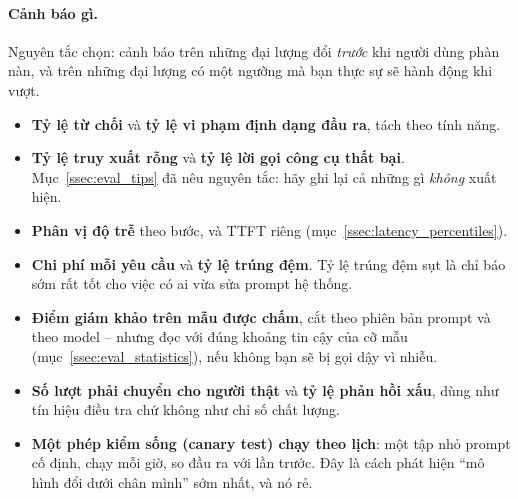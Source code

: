 \paragraph{Cảnh báo gì.} Nguyên tắc chọn: cảnh báo trên những đại lượng đổi \emph{trước} khi người dùng phàn nàn, và trên những đại lượng có một ngưỡng mà bạn thực sự sẽ hành động khi vượt.

\begin{itemize}
	\item \textbf{Tỷ lệ từ chối} và \textbf{tỷ lệ vi phạm định dạng đầu ra}, tách theo tính năng.
	\item \textbf{Tỷ lệ truy xuất rỗng} và \textbf{tỷ lệ lời gọi công cụ thất bại}. Mục~\ref{ssec:eval_tips} đã nêu nguyên tắc: hãy ghi lại cả những gì \emph{không} xuất hiện.
	\item \textbf{Phân vị độ trễ} theo bước, và TTFT riêng (mục~\ref{ssec:latency_percentiles}).
	\item \textbf{Chi phí mỗi yêu cầu} và \textbf{tỷ lệ trúng đệm}. Tỷ lệ trúng đệm sụt là chỉ báo sớm rất tốt cho việc có ai vừa sửa prompt hệ thống.
	\item \textbf{Điểm giám khảo trên mẫu được chấm}, cắt theo phiên bản prompt và theo model -- nhưng đọc với đúng khoảng tin cậy của cỡ mẫu (mục~\ref{ssec:eval_statistics}), nếu không bạn sẽ bị gọi dậy vì nhiễu.
	\item \textbf{Số lượt phải chuyển cho người thật} và \textbf{tỷ lệ phản hồi xấu}, dùng như tín hiệu điều tra chứ không như chỉ số chất lượng.
	\item \textbf{Một phép kiểm sống (canary test) chạy theo lịch}: một tập nhỏ prompt cố định, chạy mỗi giờ, so đầu ra với lần trước. Đây là cách phát hiện ``mô hình đổi dưới chân mình'' sớm nhất, và nó rẻ.
\end{itemize}

